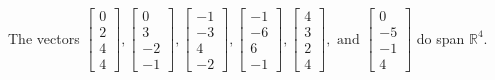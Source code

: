 \begin{exercise}
\begin{exerciseStatement}
  \end{exerciseStatement}
  \begin{exerciseAnswer}
   The vectors \(\left[\begin{array}{r}
0 \\
2 \\
4 \\
4
\end{array}\right] , \left[\begin{array}{r}
0 \\
3 \\
-2 \\
-1
\end{array}\right] , \left[\begin{array}{r}
-1 \\
-3 \\
4 \\
-2
\end{array}\right] , \left[\begin{array}{r}
-1 \\
-6 \\
6 \\
-1
\end{array}\right] , \left[\begin{array}{r}
4 \\
3 \\
2 \\
4
\end{array}\right] , \text{ and } \left[\begin{array}{r}
0 \\
-5 \\
-1 \\
4
\end{array}\right]\) 
  	 do  
	span \(\mathbb{R}^4\).
  


  \end{exerciseAnswer}
\end{exercise}